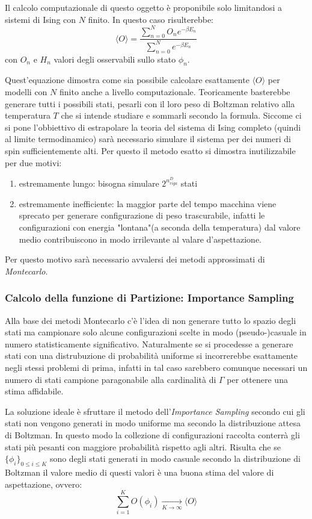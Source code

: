 Il calcolo computazionale di questo oggetto è proponibile solo limitandosi a sistemi di Ising con $N$ finito. In questo caso risulterebbe:
\begin{equation}\label{aspettazione finito}
\langle O \rangle = \frac{\sum_{n=0}^{N} O_n e^{-\beta E_n}}{\sum_{n=0}^{N} e^{-\beta E_n}}
\end{equation}
con $O_n$ e $H_n$ valori degli osservabili sullo stato $\phi_n$.

Quest'equazione dimostra come sia possibile calcolare esattamente $\langle O \rangle$ per modelli con $N$ finito anche a livello computazionale. Teoricamente basterebbe generare tutti i possibili stati, pesarli con il loro peso di Boltzman relativo alla temperatura $T$ che si intende studiare e sommarli secondo la formula.
Siccome ci si pone l'obbiettivo  di estrapolare la teoria del sistema di Ising completo (quindi al limite termodinamico) sarà necessario simulare il sistema per dei numeri di spin sufficientemente alti.
Per questo il metodo esatto si dimostra inutilizzabile per due motivi: 
\begin{enumerate}
\item estremamente lungo: bisogna simulare $2^{n_{riga}^D}$ stati
\item estremamente inefficiente: la maggior parte del tempo macchina viene sprecato per generare configurazione di peso trascurabile, infatti le configurazioni con energia "lontana"(a seconda della temperatura) dal valore medio contribuiscono in modo irrilevante al valare d'aspettazione.
\end{enumerate}
Per questo motivo sarà necessario avvalersi dei metodi approssimati di \emph{Montecarlo}.

\subsubsection{Calcolo della funzione di Partizione: Importance Sampling}
Alla base dei metodi Montecarlo c'è l'idea di non generare tutto lo spazio degli stati ma campionare solo alcune configurazioni scelte in modo (pseudo-)casuale in numero statisticamente significativo.
Naturalmente se si procedesse a generare stati con una distrubuzione di probabilità uniforme si incorrerebbe esattamente negli stessi problemi di prima, infatti in tal caso sarebbero comunque necessari un numero di stati campione paragonabile alla cardinalità di $\Gamma$  per ottenere una stima affidabile.

La soluzione ideale è sfruttare il metodo dell'\emph{Importance Sampling} secondo cui gli stati non vengono generati in modo uniforme ma secondo la distribuzione attesa di Boltzman. In questo modo la collezione di configurazioni raccolta conterrà gli stati più pesanti con maggiore probabilità rispetto agli altri.
Risulta che se $\lbrace\phi_i\rbrace _{0\leq i \leq K}$ sono degli stati generati in modo casuale secondo la distribuzione di Boltzman il valore medio di questi valori è una buona stima del valore di aspettazione, ovvero:
\begin{equation}\label{aspettazione Monte}
\sum_{i=1}^K O(\phi_i) \xrightarrow[K\rightarrow \infty]{} \langle O \rangle
\end{equation}

